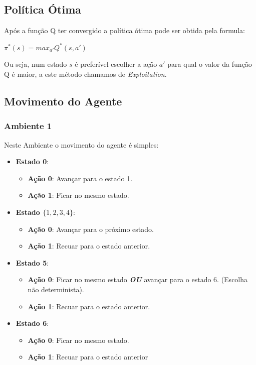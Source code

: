 \documentclass[9pt, a4paper, twocolumn]{article}
\begin{document}
\subsection{Política Ótima}
\hspace{10mm}Após a função Q ter convergido a política ótima pode ser obtida
pela formula:
\begin{center}
$\displaystyle\pi^*(s) = max_{a'} Q^*(s, a')$
\end{center}
Ou seja, num estado $s$ é preferível escolher a ação $a'$ para qual o valor da função Q é maior, a este método chamamos de \textit{Exploitation}.
\subsection{Movimento do Agente}
\subsubsection{Ambiente 1}
Neste Ambiente o movimento do agente é simples:
\begin{itemize}
\item \textbf{Estado 0}:
\begin{itemize}
\item \textbf{Ação 0}: Avançar para o estado 1.
\item \textbf{Ação 1}: Ficar no mesmo estado.
\end{itemize}
\item \textbf{Estado $\{1, 2, 3, 4\}$}:
\begin{itemize}
\item \textbf{Ação 0}: Avançar para o próximo estado.
\item \textbf{Ação 1}: Recuar para o estado anterior.
\end{itemize}
\item \textbf{Estado 5}: 
\begin{itemize}
\item \textbf{Ação 0}: Ficar no mesmo estado \textit{\textbf{OU}} avançar para o estado 6. (Escolha não determinista).
\item \textbf{Ação 1}: Recuar para o estado anterior.
\end{itemize}
\item \textbf{Estado 6}:
\begin{itemize}
\item \textbf{Ação 0}: Ficar no mesmo estado.
\item \textbf{Ação 1}: Recuar para o estado anterior
\end{itemize}
\end{itemize}
\end{document}
